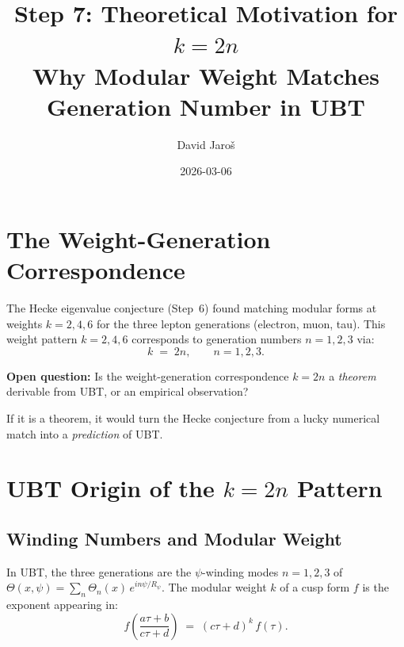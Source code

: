 \documentclass[12pt,a4paper]{article}
\title{\textbf{Step 7: Theoretical Motivation for $k = 2n$}\\
       \large Why Modular Weight Matches Generation Number in UBT}
\author{David Jaro\v{s}}
\date{2026-03-06}
\theoremstyle{definition}
\theoremstyle{remark}
\begin{document}
\maketitle
\tableofcontents

\section{The Weight-Generation Correspondence}
\label{sec:wg_correspondence}

The Hecke eigenvalue conjecture (Step~6) found matching modular forms
at weights $k = 2, 4, 6$ for the three lepton generations (electron, muon, tau).
This weight pattern $k = 2, 4, 6$ corresponds to generation numbers $n = 1, 2, 3$
via:
\begin{equation}
  k \;=\; 2n, \qquad n = 1, 2, 3.
\end{equation}

\begin{gapbox}
\textbf{Open question:} Is the weight-generation correspondence $k = 2n$ a
\emph{theorem} derivable from UBT, or an empirical observation?

If it is a theorem, it would turn the Hecke conjecture from a lucky
numerical match into a \emph{prediction} of UBT.
\end{gapbox}

\section{UBT Origin of the $k = 2n$ Pattern}
\label{sec:origin}

\subsection{Winding Numbers and Modular Weight}

In UBT, the three generations are the $\psi$-winding modes $n = 1, 2, 3$
of $\Theta(x, \psi) = \sum_n \Theta_n(x)\,e^{in\psi/R_\psi}$.
The modular weight $k$ of a cusp form $f$ is the exponent appearing in:
\begin{equation}
  f\!\left(\frac{a\tau + b}{c\tau + d}\right)
  \;=\; (c\tau + d)^k\,f(\tau).
\end{equation}
\end{document}
